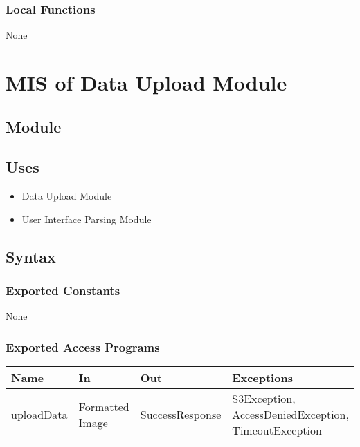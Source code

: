 \documentclass[12pt, titlepage]{article}
\begin{document}
\subsubsection{Local Functions}

None

\newpage


\section{MIS of Data Upload Module} \label{Module}

\subsection{Module}

\subsection{Uses}

\begin{itemize}
  \item Data Upload Module
  \item User Interface Parsing Module
\end{itemize}

\subsection{Syntax}

\subsubsection{Exported Constants}

None

\subsubsection{Exported Access Programs}

\begin{center}
\begin{tabular}{p{2cm} p{4cm} p{4cm} p{2cm}}
\hline
\textbf{Name} & \textbf{In} & \textbf{Out} & \textbf{Exceptions} \\
\hline
uploadData & Formatted Image & SuccessResponse & S3Exception, AccessDeniedException, TimeoutException \\
\hline
\end{tabular}
\end{center}
\end{document}
